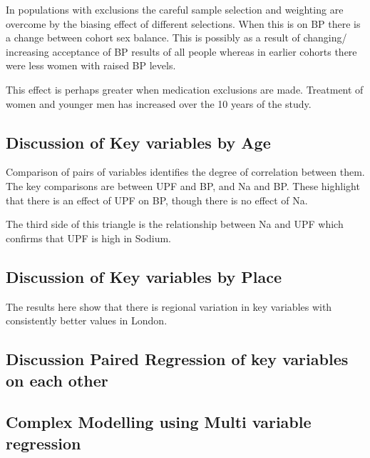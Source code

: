 \documentclass[
]{article}
\begin{document}
In populations with exclusions the careful sample selection and
weighting are overcome by the biasing effect of different selections.
When this is on BP there is a change between cohort sex balance. This is
possibly as a result of changing/ increasing acceptance of BP results of
all people whereas in earlier cohorts there were less women with raised
BP levels.

This effect is perhaps greater when medication exclusions are made.
Treatment of women and younger men has increased over the 10 years of
the study.

\hypertarget{discussion-of-key-variables-by-age}{%
\subsection{Discussion of Key variables by
Age}\label{discussion-of-key-variables-by-age}}

Comparison of pairs of variables identifies the degree of correlation
between them. The key comparisons are between UPF and BP, and Na and BP.
These highlight that there is an effect of UPF on BP, though there is no
effect of Na.

The third side of this triangle is the relationship between Na and UPF
which confirms that UPF is high in Sodium.

\hypertarget{discussion-of-key-variables-by-place}{%
\subsection{Discussion of Key variables by
Place}\label{discussion-of-key-variables-by-place}}

The results here show that there is regional variation in key variables
with consistently better values in London.

\hypertarget{discussion-paired-regression-of-key-variables-on-each-other}{%
\subsection{Discussion Paired Regression of key variables on each
other}\label{discussion-paired-regression-of-key-variables-on-each-other}}

\hypertarget{complex-modelling-using-multi-variable-regression-1}{%
\subsection{Complex Modelling using Multi variable
regression}\label{complex-modelling-using-multi-variable-regression-1}}
\end{document}
